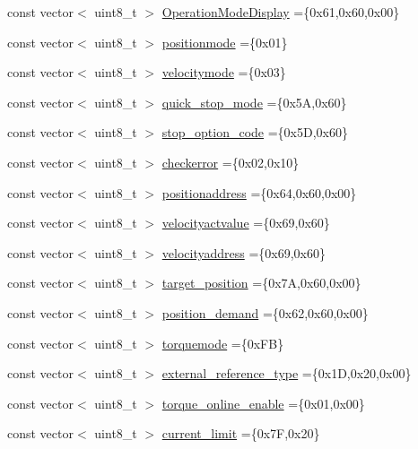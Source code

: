 \begin{DoxyCompactItemize}
\item 
const vector$<$ uint8\+\_\+t $>$ \hyperlink{namespaceod_a0469b45cd9158b638f0e0d6ed1102742}{Operation\+Mode\+Display} =\{0x61,0x60,0x00\}
\item 
const vector$<$ uint8\+\_\+t $>$ \hyperlink{namespaceod_a85efca0656a6714d7227858e112c4a73}{positionmode} =\{0x01\}
\item 
const vector$<$ uint8\+\_\+t $>$ \hyperlink{namespaceod_a2771fb30adf397c1cd2ddb092a414e82}{velocitymode} =\{0x03\}
\item 
const vector$<$ uint8\+\_\+t $>$ \hyperlink{namespaceod_ab5b4d34058d08a758277bf52cd31d8c9}{quick\+\_\+stop\+\_\+mode} =\{0x5\+A,0x60\}
\item 
const vector$<$ uint8\+\_\+t $>$ \hyperlink{namespaceod_af1bc07726906ffc6ea25ab9abb478143}{stop\+\_\+option\+\_\+code} =\{0x5\+D,0x60\}
\item 
const vector$<$ uint8\+\_\+t $>$ \hyperlink{namespaceod_ac4b980a10ae256ea019a767459b6ba9b}{checkerror} =\{0x02,0x10\}
\item 
const vector$<$ uint8\+\_\+t $>$ \hyperlink{namespaceod_a716df35f1a3cc3e1792c033be7fc0518}{positionaddress} =\{0x64,0x60,0x00\}
\item 
const vector$<$ uint8\+\_\+t $>$ \hyperlink{namespaceod_ad2c386d1f9bfc49b8a247f0b093f8963}{velocityactvalue} =\{0x69,0x60\}
\item 
const vector$<$ uint8\+\_\+t $>$ \hyperlink{namespaceod_adf45781fb80275c184d548ea793b376b}{velocityaddress} =\{0x69,0x60\}
\item 
const vector$<$ uint8\+\_\+t $>$ \hyperlink{namespaceod_a0bdcdb539c588cfae0d43cc0ba40ea05}{target\+\_\+position} =\{0x7\+A,0x60,0x00\}
\item 
const vector$<$ uint8\+\_\+t $>$ \hyperlink{namespaceod_a1d5963cb8a002987c96fae2e172790ee}{position\+\_\+demand} =\{0x62,0x60,0x00\}
\item 
const vector$<$ uint8\+\_\+t $>$ \hyperlink{namespaceod_a53c06ba9dc3fe72c8fd5fed43563a4a0}{torquemode} =\{0x\+F\+B\}
\item 
const vector$<$ uint8\+\_\+t $>$ \hyperlink{namespaceod_a1a637a5186ac9c6af08693d9ed6743f7}{external\+\_\+reference\+\_\+type} =\{0x1\+D,0x20,0x00\}
\item 
const vector$<$ uint8\+\_\+t $>$ \hyperlink{namespaceod_a60236897674f64937c4d14fb0732f892}{torque\+\_\+online\+\_\+enable} =\{0x01,0x00\}
\item 
const vector$<$ uint8\+\_\+t $>$ \hyperlink{namespaceod_a8c8991f592c7384071f4d1773ba1609b}{current\+\_\+limit} =\{0x7\+F,0x20\}

\end{DoxyCompactItemize}
